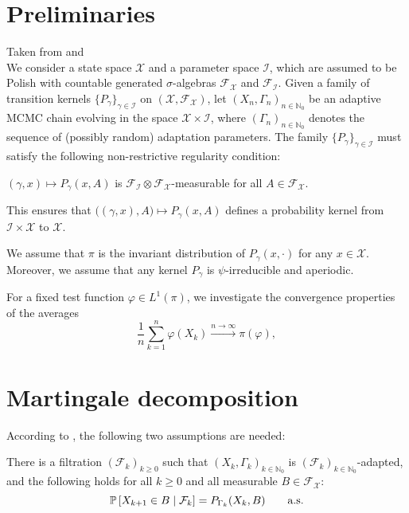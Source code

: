 

\section{Preliminaries}
\label{sec:preliminaries}

Taken from \cite{hofstadler2024sureconvergenceratesadaptive} and \cite{laitinen2024invitationadaptivemarkovchain}
\\
We consider a state space $\mathcal{X} $ and a parameter space $\mathcal{I}$, which are assumed to be Polish with countable generated $\sigma$-algebras $\mathcal{F}_\mathcal{X}$ and $\mathcal{F}_{\mathcal{I}}$.  
Given a family of transition kernels $\{ {P}_\gamma \}_{\gamma \in \mathcal{I}}$ on $(\mathcal{X}, \mathcal{F}_{\mathcal{X}})$, let  $(X_n, \Gamma_n)_{n \in \mathbb{N}_0}$ be an adaptive MCMC chain evolving in the space $\mathcal{X} \times \mathcal{I}$, where $(\Gamma_n)_{n \in \mathbb{N}_0}$ denotes the sequence of (possibly random) adaptation parameters.
The family $\{P_\gamma\}_{\gamma\in\mathcal{I}}$ must satisfy the following non-restrictive regularity condition: 
\begin{assumption}[Regularity]
    \label{a:regularity}
        $(\gamma,x) \mapsto P_\gamma(x,A)$ is $\mathcal{F}_{\mathcal{I}} \otimes \mathcal{F}_{\mathcal{X}}$-measurable for all $A\in\mathcal{F}_{\mathcal{X}}$.
\end{assumption}
This ensures that $\big((\gamma,x), A\big) \mapsto P_\gamma(x,A)$ defines a probability kernel from $\mathcal{I}\times\mathcal{X}$ to $\mathcal{X}$.

We assume that $\pi$ is the invariant distribution of ${P}_\gamma(x, \cdot )$ for any $x \in \mathcal{X}$.
Moreover, we assume that any kernel $P_\gamma$ is $\psi$-irreducible and aperiodic.

For a fixed test function $\varphi\in L^1(\pi)$, we investigate the convergence properties of the averages
\begin{equation}
\frac{1}{n}\sum_{k=1}^n \varphi(X_k) \xrightarrow{n\to\infty} \pi(\varphi) ,
\label{eq:lln}
\end{equation}

\section{Martingale decomposition}
According to \cite{laitinen2024invitationadaptivemarkovchain}, the following two assumptions are needed:

\begin{assumption}
   \label{a:markov}
   There is a filtration $(\mathcal{F}_k)_{k\ge 0}$ such that $(X_k, \Gamma_k)_{k \in \mathbb{N}_0}$ is $(\mathcal{F}_k)_{k \in \mathbb{N}_0}$-adapted, and the following holds for all $k\ge 0$ and all measurable $B \in \mathcal{F}_{\mathcal{X}}$:
   \[
   \mathbb{P} \left[ X_{k+1}\in B\mid \mathcal{F}_k \right] = P_{\Gamma_k}(X_k,B) \qquad \text{a.s.}
   \]
\end{assumption}

